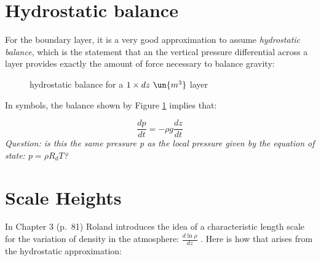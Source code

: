\documentclass[12pt]{article}
\begin{document}
\newcommand{\vect}[1]{\boldsymbol{\vec{#1}}}
\pagestyle{first}

\section{Hydrostatic balance}


For the boundary layer, it is a very good approximation to
assume \textit{hydrostatic balance}, which is the statement that an
the vertical pressure differential across a layer provides exactly the
amount of force necessary to balance gravity:

  \begin{figure}[H]
    \begin{center}
       
      \caption{hydrostatic balance for a $1 \times dz\  \un{m^3}$ layer}
      \label{fig:hydro}
    \end{center}
  \end{figure}

\vspace{0.1in}

In symbols, the balance shown by Figure \ref{fig:hydro} implies that:

\begin{equation}
  \label{eq:hydro}
  \frac{dp}{dt} = - \rho g \frac{dz}{dt}
\end{equation}
\textit{Question:  is this the same pressure p as the local pressure given by the equation of state: $p=\rho R_d T$?}

\section{Scale Heights}
\label{sec:scale-heights}

In Chapter 3 (p.~81) Roland introduces the idea of a characteristic
length scale for the variation of density in the atmosphere: $\frac{d \ln \rho }{dz}$ .  Here
is how that arises from the hydrostatic approximation:
\end{document}
